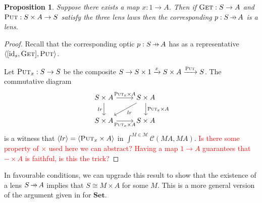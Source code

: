 \documentclass[11pt,a4paper]{article}
\theoremstyle{plain}
\newtheorem{proposition}[theorem]{Proposition}
\theoremstyle{definition}
\newcommand{\C}{\mathscr{C}}
\newcommand{\M}{\mathscr{M}}
\newcommand{\Set}{\mathbf{Set}}
\newcommand{\id}{\mathrm{id}}
\newcommand{\fget}{\textsc{Get}}
\newcommand{\fput}{\textsc{Put}}
\newcommand{\hto}{\ensuremath{\,\mathaccent\shortmid\rightarrow\,}}
\newcommand{\todo}[1]{\textcolor{red}{\small #1}}
\begin{document}
\begin{proposition}
Suppose there exists a map $x : 1 \to A$. Then if $\fget : S \to A$ and $\fput : S \times A \to S$ satisfy the three lens laws then the corresponding $p : S \hto A$ is a lens.
\end{proposition}
\begin{proof}
Recall that the corresponding optic $p : S \hto A$ has as a representative $\langle [\id_s, \fget], \fput \rangle$.

Let $\fput_x : S \to S$ be the composite $S \to S \times 1 \xrightarrow{x} S \times A \xrightarrow{\fput} S$. The commutative diagram
\[
\begin{tikzcd}
S \times A \ar[r, "\fput_x \times A "] \ar[d, "lr", swap] & S \times A \ar[d, "\fput_x \times A"] \ar[dl, "lr"] \\
S \times A \ar[r, "\fput_x \times A", swap] & S \times A
\end{tikzcd}
\]
is a witness that $\langle lr \rangle = \langle \fput_x \times A \rangle$ in $\int^{M \in \M} \C(M A, M A)$.
\todo{Is there some property of $\times$ used here we can abstract? Having a map $1 \to A$ guarantees that $- \times A$ is faithful, is this the trick?}
\end{proof}

In favourable conditions, we can upgrade this result to show that the existence of a lens $S \hto A$ implies that $S \cong M \times A$ for some $M$. This is a more general version of the argument given in \cite[Corollary 13]{AlgebrasAndUpdateStrategies} for $\Set$.
\end{document}
